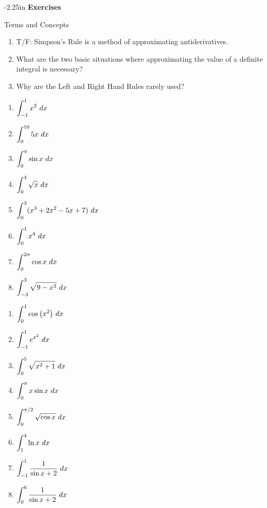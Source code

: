 \begin{adjustwidth*}{}{-2.25in}
\textbf{{\large Exercises}}
\setlength{\columnsep}{25pt}
\begin{multicols*}{2}
\noindent Terms and Concepts \small
\begin{enumerate}[1)]
\item T/F: Simpson's Rule is a method of approximating antiderivatives.
\item What are the two basic situations where approximating the value of a definite integral is necessary?
\item Why are the Left and Right Hand Rules rarely used?
\end{enumerate} 

 \small


\begin{enumerate}[1),resume]
\item $\ds \int_{-1}^1 x^2\ dx$
\item $\ds \int_{0}^{10} 5x\ dx$
\item $\ds \int_{0}^{\pi} \sin x\ dx$
\item $\ds \int_{0}^{4} \sqrt x\ dx$
\item $\ds \int_{0}^{3} (x^3+2x^2-5x+7)\ dx$
\item $\ds \int_{0}^{1} x^4\ dx$
\item $\ds \int_{0}^{2\pi} \cos x\ dx$
\item $\ds \int_{-3}^{3} \sqrt{9-x^2} \ dx$
\end{enumerate}


\begin{enumerate}[1),resume]
\item $\ds \int_{0}^{1} \cos \big(x^2\big) \ dx$
\item $\ds \int_{-1}^{1} e^{x^2} \ dx$
\item $\ds \int_{0}^{5} \sqrt{x^2+1} \ dx$
\item $\ds \int_{0}^{\pi} x\sin x \ dx$
\item $\ds \int_{0}^{\pi/2} \sqrt{\cos x} \ dx$
\item $\ds \int_{1}^{4} \ln x \ dx$
\item $\ds \int_{-1}^{1} \frac{1}{\sin x+2} \ dx$
\item $\ds \int_{0}^{6} \frac{1}{\sin x+2} \ dx$
\end{enumerate}


\end{multicols*}
\end{adjustwidth*}
